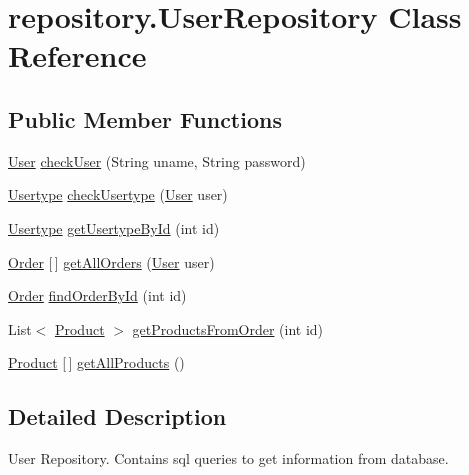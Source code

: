 \hypertarget{classrepository_1_1_user_repository}{}\section{repository.\+User\+Repository Class Reference}
\label{classrepository_1_1_user_repository}
\subsection*{Public Member Functions}
\begin{DoxyCompactItemize}
\item 
\mbox{\hyperlink{classentity_1_1_user}{User}} \mbox{\hyperlink{classrepository_1_1_user_repository_adf10692a176bf2819fb70895530ef086}{check\+User}} (String uname, String password)
\item 
\mbox{\hyperlink{classentity_1_1_usertype}{Usertype}} \mbox{\hyperlink{classrepository_1_1_user_repository_a8e4a797c0eb806d34793295af70fd281}{check\+Usertype}} (\mbox{\hyperlink{classentity_1_1_user}{User}} user)
\item 
\mbox{\hyperlink{classentity_1_1_usertype}{Usertype}} \mbox{\hyperlink{classrepository_1_1_user_repository_a7da3f6411186e8169f5730638e6a4032}{get\+Usertype\+By\+Id}} (int id)
\item 
\mbox{\hyperlink{classentity_1_1_order}{Order}} \mbox{[}$\,$\mbox{]} \mbox{\hyperlink{classrepository_1_1_user_repository_a56980daa937375f2c13ceb712a08aace}{get\+All\+Orders}} (\mbox{\hyperlink{classentity_1_1_user}{User}} user)
\item 
\mbox{\hyperlink{classentity_1_1_order}{Order}} \mbox{\hyperlink{classrepository_1_1_user_repository_a487c490af80c0a94477bfcfdbe7d288f}{find\+Order\+By\+Id}} (int id)
\item 
List$<$ \mbox{\hyperlink{classentity_1_1_product}{Product}} $>$ \mbox{\hyperlink{classrepository_1_1_user_repository_a413de9a5357ced95cfe6524c47b98bee}{get\+Products\+From\+Order}} (int id)
\item 
\mbox{\hyperlink{classentity_1_1_product}{Product}} \mbox{[}$\,$\mbox{]} \mbox{\hyperlink{classrepository_1_1_user_repository_a91aaaa79a8c1be15fc6111a9467c981e}{get\+All\+Products}} ()
\end{DoxyCompactItemize}


\subsection{Detailed Description}
User Repository. Contains sql queries to get information from database.

